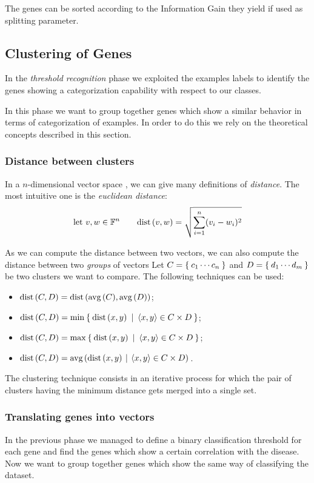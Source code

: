         The genes can be sorted according to the Information Gain they
        yield if used as splitting parameter.

\subsection{ Clustering of Genes } \label{sub:Clustering}

    In the \emph{threshold recognition} phase we exploited the examples
    labels to identify the genes showing a categorization capability with
    respect to our classes.

    In this phase we want to group together genes which show a similar
    behavior in terms of categorization of examples. In order to do this
    we rely on the theoretical concepts described in this section.

    \subsubsection{ Distance between clusters }

        In a $n$-dimensional vector space \VecFn, we can give
        many definitions of \emph{distance}. The most intuitive one
        is the \emph{euclidean distance}:
        \[
        \mbox{let } v, w \in \mathbb{F}^n \qquad
        \mbox{dist}\left({v},{w}\right) = \sqrt{\sum_{i = 1}^n (v_i - w_i)^2 }
        \]

        As we can compute the distance between two vectors, we can also
        compute the distance between two \emph{groups} of vectors
        Let $C = \Set{ c_1 \cdots c_n }$ and $D = \Set{ d_1 \cdots d_m }$
        be two clusters we want to compare. The following techniques can
        be used:
        \begin{itemize}
        \item   $\mbox{dist}\left({C},{D}\right) = \mbox{dist}\left({\mbox{avg}\left({C}\right)},{\mbox{avg}\left({D}\right)}\right)$;
        \item   $\mbox{dist}\left({C},{D}\right) = \mbox{min}_{}\Set{\mbox{dist}\left({x},{y}\right) \:|\:\ensuremath{\left \langle {x,y} \right \rangle } \in
                                         C \times D}$;
        \item   $\mbox{dist}\left({C},{D}\right) = \mbox{max}_{}\Set{\mbox{dist}\left({x},{y}\right) \:|\:\ensuremath{\left \langle {x,y} \right \rangle } \in
                                         C \times D}$;
        \item   $\mbox{dist}\left({C},{D}\right) = \mbox{avg}\left({\mbox{dist}\left({x},{y}\right) \:|\: \left \langle {x,y} \right \rangle  \in
                                         C \times D}\right){}$.
        \end{itemize}

        The clustering technique consists in an iterative process for
        which the pair of clusters having the minimum distance gets merged
        into a single set.

    \subsubsection{ Translating genes into vectors }

        In the previous phase we managed to define a binary classification
        threshold for each gene and find the genes which show a certain
        correlation with the disease. Now we want to group together genes
        which show the same way of classifying the dataset.

